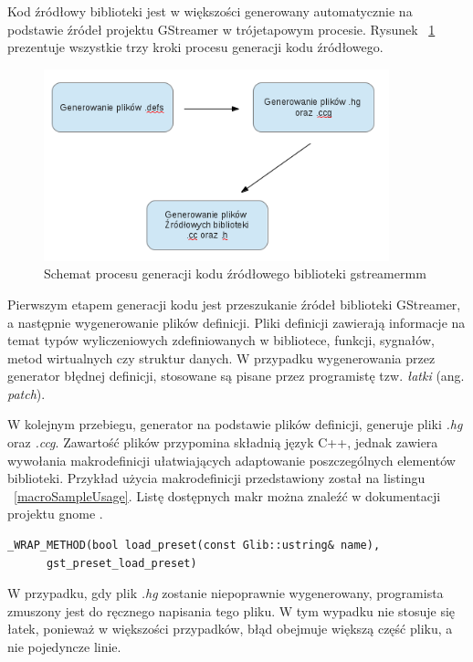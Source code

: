 \documentclass[12pt]{article}
\begin{document}
Kod źródłowy biblioteki jest w większości generowany automatycznie na podstawie źródeł projektu GStreamer w trójetapowym procesie. Rysunek ~\ref{fig:mmGenerateProcess} prezentuje wszystkie trzy kroki procesu generacji kodu źródłowego.
\begin{figure}[H]
  \includegraphics[width=100mm]{img/mm-generate-process.png}
  \caption{Schemat procesu generacji kodu źródłowego biblioteki gstreamermm}
  \label{fig:mmGenerateProcess}
\end{figure}
Pierwszym etapem generacji kodu jest przeszukanie źródeł biblioteki GStreamer, a następnie wygenerowanie plików definicji. Pliki definicji zawierają informacje na temat typów wyliczeniowych zdefiniowanych w bibliotece, funkcji, sygnałów, metod wirtualnych czy struktur danych. W przypadku wygenerowania przez generator błędnej definicji, stosowane są pisane przez programistę tzw. \textit{łatki} (ang. \textit{patch}).

W kolejnym przebiegu, generator na podstawie plików definicji, generuje pliki \textit{.hg} oraz \textit{.ccg}. Zawartość plików przypomina składnią język C++, jednak zawiera wywołania makrodefinicji ułatwiających adaptowanie poszczególnych elementów biblioteki. Przykład użycia makrodefinicji przedstawiony został na listingu ~\ref{macroSampleUsage}.
Listę dostępnych makr można znaleźć w dokumentacji projektu gnome \cite{devgnomepage}.
    \begin{lstlisting}[caption=Przykład użycia makrodefinicji w pliku \textit{.hg}, label=macroSampleUsage]
_WRAP_METHOD(bool load_preset(const Glib::ustring& name), 
      gst_preset_load_preset)
    \end{lstlisting}
    W przypadku, gdy plik \textit{.hg} zostanie niepoprawnie wygenerowany, programista zmuszony jest do ręcznego napisania tego pliku. W tym wypadku nie stosuje się łatek, ponieważ w większości przypadków, błąd obejmuje większą część pliku, a nie pojedyncze linie.
\end{document}
